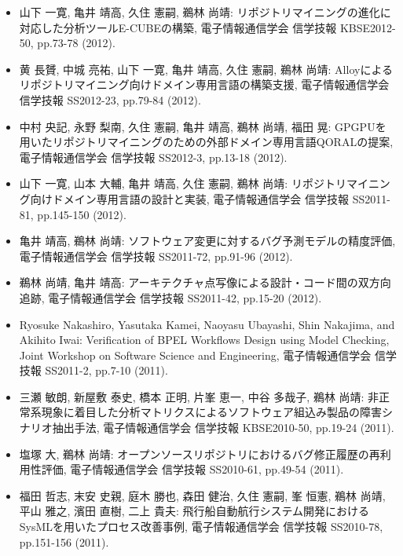 \documentclass{jarticle}
\begin{document}
\begin{itemize}
\item 山下 一寛, 亀井 靖高, 久住 憲嗣, 鵜林 尚靖:
リポジトリマイニングの進化に対応した分析ツールE-CUBEの構築,
電子情報通信学会 信学技報 KBSE2012-50, pp.73-78 (2012).

\item 黄 長贇, 中城 亮祐, 山下 一寛, 亀井 靖高, 久住 憲嗣, 鵜林 尚靖:
Alloyによるリポジトリマイニング向けドメイン専用言語の構築支援,
電子情報通信学会 信学技報 SS2012-23, pp.79-84 (2012).

\item 中村 央記, 永野 梨南, 久住 憲嗣, 亀井 靖高, 鵜林 尚靖, 福田 晃:
GPGPUを用いたリポジトリマイニングのための外部ドメイン専用言語QORALの提案,
電子情報通信学会 信学技報 SS2012-3, pp.13-18 (2012).

\item 山下 一寛, 山本 大輔, 亀井 靖高, 久住 憲嗣, 鵜林 尚靖:
リポジトリマイニング向けドメイン専用言語の設計と実装,
電子情報通信学会 信学技報 SS2011-81, pp.145-150 (2012).

\item 亀井 靖高, 鵜林 尚靖:
ソフトウェア変更に対するバグ予測モデルの精度評価,
電子情報通信学会 信学技報 SS2011-72, pp.91-96 (2012).

\item 鵜林 尚靖, 亀井 靖高:
アーキテクチャ点写像による設計・コード間の双方向追跡,
電子情報通信学会 信学技報 SS2011-42, pp.15-20 (2012).

\item Ryosuke Nakashiro, Yasutaka Kamei, Naoyasu Ubayashi, Shin Nakajima, and Akihito Iwai:
Verification of BPEL Workflows Design using Model Checking,
Joint Workshop on Software Science and Engineering,
電子情報通信学会 信学技報 SS2011-2, pp.7-10 (2011).

\item 三瀬 敏朗, 新屋敷 泰史, 橋本 正明, 片峯 恵一, 中谷 多哉子, 鵜林 尚靖:
非正常系現象に着目した分析マトリクスによるソフトウェア組込み製品の障害シナリオ抽出手法,
電子情報通信学会 信学技報 KBSE2010-50, pp.19-24 (2011).

\item 塩塚 大, 鵜林 尚靖:
オープンソースリポジトリにおけるバグ修正履歴の再利用性評価,
電子情報通信学会 信学技報 SS2010-61, pp.49-54 (2011).

\item 福田 哲志, 末安 史親, 庭木 勝也, 森田 健治, 久住 憲嗣, 峯 恒憲, 鵜林 尚靖, 平山 雅之, 濱田 直樹, 二上 貴夫:
飛行船自動航行システム開発におけるSysMLを用いたプロセス改善事例,
電子情報通信学会 信学技報 SS2010-78, pp.151-156 (2011).


\end{itemize}
\end{document}
